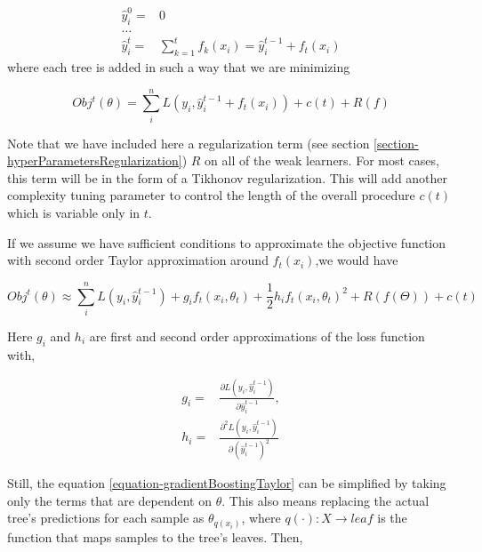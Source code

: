 \begin{equation}\label{eq:gb-targetSteps}
\begin{split}
\hat{y}_i^0 = & 0 \\
\ldots \\
\hat{y}_i^t = &\sum_{k=1}^{t} f_k(x_i) = \hat{y}^{t-1}_i + f_t(x_i)
\end{split}
\end{equation}
where each tree is added in such a way that we are minimizing

\begin{equation}
Obj^t(\theta) = \sum_i^n L(y_i, \hat{y}^{t-1}_i + f_t(x_i) ) + c(t) + R(f)
\end{equation}


Note that we have included here a regularization term (see section \cref{section-hyperParametersRegularization}) $R$ on all of the weak learners. For most cases, this term will be in the form of a Tikhonov regularization. This will add another complexity tuning parameter to control the length of the overall procedure $c(t)$ which is variable only in $t$.

If we assume we have sufficient conditions to approximate the objective function with second order Taylor approximation around $f_t(x_i)$,we would have

\begin{equation}\label{equation-gradientBoostingTaylor}
Obj^t(\theta) \approx \sum_i^n {L(y_i, \hat{y}^{t-1}_i) + g_i f_t(x_i,\theta_t) + \frac{1}{2} h_i {f_t(x_i,\theta_t)}^2 } + R(f(\Theta)) + c(t)
\end{equation}

Here $g_i$ and $h_i$ are first and second order approximations of the loss function with,

\begin{equation}
\begin{split}
g_i = & \frac{\partial L(y_i, \hat{y}^{t-1}_i)}{\partial \hat{y}^{t-1}_i},  \\
h_i = & \frac{\partial^2 L(y_i, \hat{y}^{t-1}_i)}{\partial {(\hat{y}^{t-1}_i)}^2 }
\end{split}
\end{equation}

Still, the equation \cref{equation-gradientBoostingTaylor} can be simplified by taking only the terms that are dependent on $\theta$. This also means replacing the actual tree's predictions for each sample as $\theta_{q(x_i)}$, where $q(\cdot): X \rightarrow leaf$ is the function that maps samples to the tree's leaves. Then,

